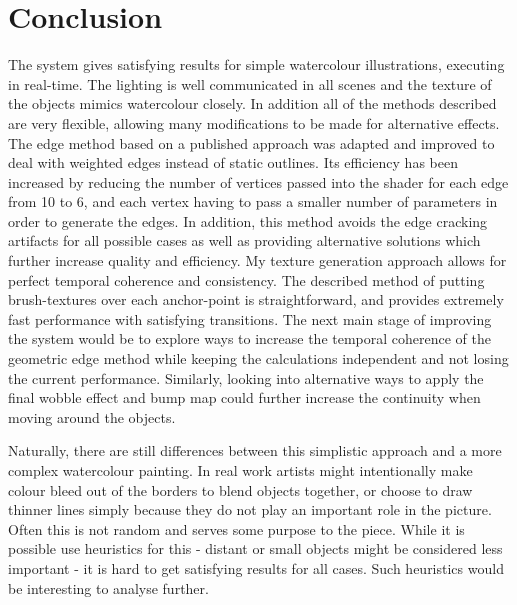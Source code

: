 \documentclass[a4paper,10pt]{article}
\begin{document}

\section{Conclusion}
The system gives satisfying results for simple watercolour illustrations, executing in real-time. The lighting is well communicated in all scenes and the texture of the objects mimics watercolour closely. In addition all of the methods described are very flexible, allowing many modifications to be made for alternative effects. The edge method based on a published approach \cite{Hughes2004} was adapted and improved to deal with weighted edges instead of static outlines. Its efficiency has been increased by reducing the number of vertices passed into the shader for each edge from 10 to 6, and each vertex having to pass a smaller number of parameters in order to generate the edges. In addition, this method avoids the edge cracking artifacts for all possible cases as well as providing alternative solutions which further increase quality and efficiency. My texture generation approach allows for perfect temporal coherence and consistency. The described method of putting brush-textures over each anchor-point is straightforward, and provides extremely fast performance with satisfying transitions. The next main stage of improving the system would be to explore ways to increase the temporal coherence of the geometric edge method while keeping the calculations independent and not losing the current performance. Similarly, looking into alternative ways to apply the final wobble effect and bump map could further increase the continuity when moving around the objects.

Naturally, there are still differences between this simplistic approach and a more complex watercolour painting. In real work artists might intentionally make colour bleed out of the borders to blend objects together, or choose to draw thinner lines simply because they do not play an important role in the picture. Often this is not random and serves some purpose to the piece. While it is possible use heuristics for this - distant or small objects might be considered less important - it is hard to get satisfying results for all cases. Such heuristics would be interesting to analyse further.

\printbibliography
\end{document}
